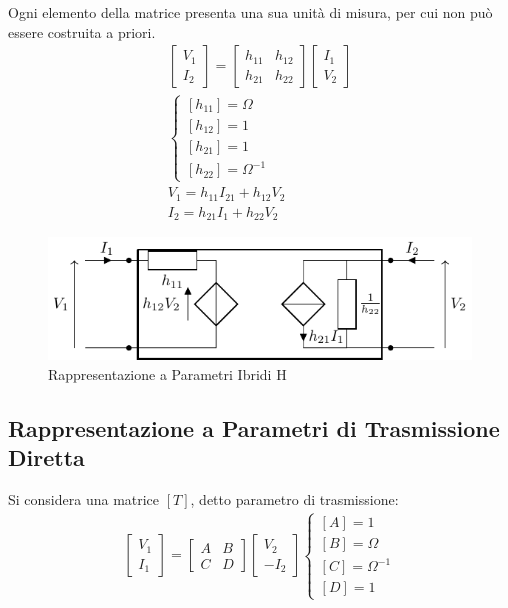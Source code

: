 \documentclass{article}
\numberwithin{equation}{subsection}
\begin{document}
Ogni elemento della matrice presenta una sua unità di misura, per cui non può essere costruita a priori. 
\begin{gather*}
    \begin{bmatrix}
        V_1\\I_2
    \end{bmatrix}=\begin{bmatrix}
        h_{11}&h_{12}\\h_{21}&h_{22}
    \end{bmatrix}\begin{bmatrix}
        I_1\\V_2
    \end{bmatrix}\\
    \begin{cases}
        [h_{11}]=\Omega\\
        [h_{12}]=1\\
        [h_{21}]=1\\
        [h_{22}]=\Omega^{-1}
    \end{cases}\\
    V_1=h_{11}I_21+h_{12}V_2\\
    I_2=h_{21}I_1+h_{22}V_2
\end{gather*}

\begin{figure}[ht]%
    \centering
    \includegraphics{rappresentazione-parametri-ibridi.pdf}
    \caption{Rappresentazione a Parametri Ibridi H}
    \label{fig:rappresentazione-parametri-ibdridi}
\end{figure}

\subsection{Rappresentazione a Parametri di Trasmissione Diretta}

Si considera una matrice $[T]$, detto parametro di trasmissione:
\begin{gather*}
    \begin{bmatrix}
        V_1\\I_1
    \end{bmatrix}=\begin{bmatrix}
        A&B\\C&D
    \end{bmatrix}\begin{bmatrix}
        V_2\\-I_2
    \end{bmatrix}
    \begin{cases}
        [A]=1\\
        [B]=\Omega\\
        [C]=\Omega^{-1}\\
        [D]=1
    \end{cases}
\end{gather*}
\end{document}
